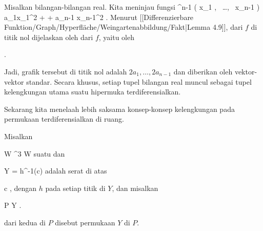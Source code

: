 {

Misalkan
 bilangan-bilangan real. Kita meninjau fungsi
 {\R^{n-1}} {\R
} { \left(  x_1   , \,   \ldots  , \,   x_{n-1}                 \right) } { a_1x_1^2  + \cdots + a_{n-1} x_{n-1}^2
} {.}
Menurut
[[Differenzierbare Funktion/Graph/Hyperfläche/Weingartenabbildung/Fakt|Lemma 4.9]],
dari
$f$ di titik nol dijelaskan oleh
dari $f$, yaitu oleh

 { . }

Jadi,
grafik tersebut di titik nol adalah $2a_1  , \ldots , 2a_{n-1}$ dan
diberikan oleh vektor-vektor standar. Secara khusus, setiap tupel bilangan real muncul sebagai tupel kelengkungan utama suatu hipermuka terdiferensialkan.

}


Sekarang kita menelaah lebih saksama konsep-konsep kelengkungan pada permukaan terdiferensialkan di ruang.

{}
{

Misalkan

\mavergleichskette
{\vergleichskette
{ W
}
{ \subseteq }{ \R^3
}
{  }{
}
{    }{
}
{   }{
}
}
{}{}{}
 { W } { \R
} {}
suatu
dan

\mavergleichskette
{\vergleichskette
{ Y
}
{ = }{ h^{-1}(c)
}
{  }{
}
{    }{
}
{   }{
}
}
{}{}{}
adalah serat di atas

\mavergleichskette
{\vergleichskette
{ c
}
{ \in }{ \R
}
{  }{
}
{    }{
}
{   }{
}
}
{}{}{,}
dengan $h$
pada setiap titik di $Y$, dan misalkan

\mavergleichskette
{\vergleichskette
{ P
}
{ \in }{ Y
}
{  }{
}
{    }{
}
{   }{
}
}
{}{}{.}

 dari kedua
di $P$ disebut
permukaan $Y$ di $P$.

}

